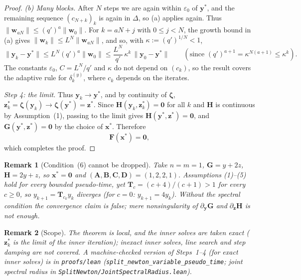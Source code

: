 \documentclass[11pt,a4paper]{article}
\newtheorem{remark}{Remark}
\begin{document}
\begin{proof}
\emph{(b) Many blocks.} After $N$ steps we are again within $\varepsilon_0$ of $\mathbf y^*$, and the
remaining sequence $(c_{N+k})_k$ is again in $\Delta$, so (a) applies again. Thus
$\|\mathbf w_{aN}\|\le(q')^{a}\|\mathbf w_0\|$. For $k=aN+j$ with $0\le j<N$, the growth bound in (a)
gives $\|\mathbf w_k\|\le L^{N}\|\mathbf w_{aN}\|$, and so, with $\kappa:=(q')^{1/N}<1$,
\[
\|\mathbf y_k-\mathbf y^*\|\le L^{N}(q')^{a}\|\mathbf w_0\|\le\frac{L^{N}}{q'}\,\kappa^{k}\,\|\mathbf y_0-\mathbf y^*\|
\qquad(\text{since }(q')^{a+1}=\kappa^{N(a+1)}\le\kappa^{k}).
\]
The constants $\varepsilon_0$, $C=L^N/q'$ and $\kappa$ do not depend on $(c_k)$, so the result covers
the adaptive rule for $\delta_k^{(y)}$, where $c_k$ depends on the iterates.

\emph{Step 4: the limit.}
Thus $\mathbf y_k\to\mathbf y^*$, and by continuity of $\boldsymbol\zeta$,
$\mathbf z_k^*=\boldsymbol\zeta(\mathbf y_k)\to\boldsymbol\zeta(\mathbf y^*)=\mathbf z^*$.
Since $\mathbf H(\mathbf y_k,\mathbf z_k^*)=\mathbf 0$ for all $k$ and
$\mathbf H$ is continuous by Assumption~(1), passing to the limit gives
$\mathbf H(\mathbf y^*,\mathbf z^*)=\mathbf 0$, and $\mathbf G(\mathbf y^*,\mathbf z^*)=\mathbf 0$
by the choice of $\mathbf x^*$. Therefore
\[
\mathbf F(\mathbf x^*) = \mathbf 0,
\]
which completes the proof.
\end{proof}

\begin{remark}[Condition~(6) cannot be dropped]
Take $n=m=1$, $\mathbf G=y+2z$, $\mathbf H=2y+z$, so $\mathbf x^*=\mathbf 0$ and
$(\mathbf A,\mathbf B,\mathbf C,\mathbf D)=(1,2,2,1)$. Assumptions (1)--(5) hold for every
bounded pseudo-time, yet $\mathbf T_c=(c+4)/(c+1)>1$ for every $c\ge0$, so
$y_{k+1}=\mathbf T_{c_k}y_k$ diverges (for $c=0$: $y_{k+1}=4y_k$). Without the spectral condition
the convergence claim is false; mere nonsingularity of $\partial_{\mathbf y}\mathbf G$ and
$\partial_{\mathbf z}\mathbf H$ is not enough.
\end{remark}

\begin{remark}[Scope]
The theorem is local, and the inner solves are taken exact ($\mathbf z_k^*$ is the limit of the
inner iteration); inexact inner solves, line search and step damping are not covered. A
machine-checked version of Steps~1--4 (for exact inner solves) is in \texttt{proofs/lean}
(\texttt{split\_newton\_variable\_pseudo\_time}; joint spectral radius in
\texttt{SplitNewton/JointSpectralRadius.lean}).
\end{remark}



\end{document}
